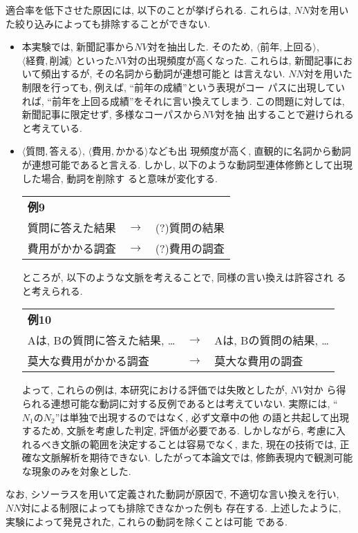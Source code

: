 適合率を低下させた原因には, 以下のことが挙げられる.
これらは, $NN対$を用いた絞り込みによっても排除することができない.
\begin{itemize}
\item 本実験では, 新聞記事から$NV対$を抽出した. 
      そのため, $\langle 前年,上回る\rangle$, $\langle 経費,削減\rangle$
      といった$NV対$の出現頻度が高くなった. 
      これらは, 新聞記事において頻出するが, その名詞から動詞が連想可能と
      は言えない. 
      $NN対$を用いた制限を行っても, 例えば, ``前年の成績''という表現がコー
      パスに出現していれば, ``前年を上回る成績''をそれに言い換えてしまう.
      この問題に対しては, 新聞記事に限定せず, 多様なコーパスから$NV対$を抽
      出することで避けられると考えている.

\item $\langle 質問,答える\rangle$, $\langle 費用,かかる\rangle$なども出
      現頻度が高く, 直観的に名詞から動詞が連想可能であると言える.
      しかし, 以下のような動詞型連体修飾として出現した場合, 動詞を削除す
      ると意味が変化する.\\
 \begin{center}
 \begin{tabular}{lcc}
  {\bf 例9} && \\
  質問に答えた結果 & $\to$ & (?)質問の結果\\
  費用がかかる調査  & $\to$ & (?)費用の調査 \\
 \end{tabular}
 \end{center}
      \noindent
      ところが, 以下のような文脈を考えることで, 同様の言い換えは許容され
      ると考えられる. \\
 \begin{center}
 \begin{tabular}{lcl}
  {\bf 例10} && \\
  Aは, Bの質問に答えた結果, … & $\to$ & Aは, Bの質問の結果, …\\
  莫大な費用がかかる調査  & $\to$ & 莫大な費用の調査 \\
 \end{tabular}
 \end{center}
      \noindent
      よって, これらの例は, 本研究における評価では失敗としたが, $NV対$か
      ら得られる連想可能な動詞に対する反例であるとは考えていない.
      実際には, ``$N_1のN_2$''は単独で出現するのではなく, 必ず文章中の他
      の語と共起して出現するため, 文脈を考慮した判定, 評価が必要である.
      しかしながら, 考慮に入れるべき文脈の範囲を決定することは容易でなく, 
      また, 現在の技術では, 正確な文脈解析を期待できない. 
      したがって本論文では, 修飾表現内で観測可能な現象のみを対象とした.
\end{itemize}
なお, シソーラスを用いて定義された動詞が原因で, 
不適切な言い換えを行い, $NN対$による制限によっても排除できなかった例も
存在する.
上述したように, 実験によって発見された, これらの動詞を除くことは可能
である.


